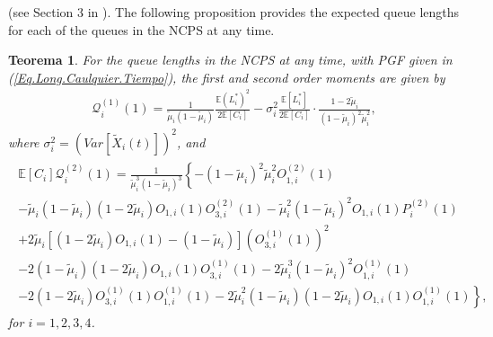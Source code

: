 \documentclass{article}
\newtheorem{Teo}{Teorema}
\newcommand{\esp}{\mathbb{E}}
\begin{document}
(see Section 3 in \cite{Takagi}). The following proposition provides the expected queue lengths for each of the queues in the NCPS at any time.
\begin{Teo}
For the queue lengths in the NCPS at any time, with PGF given in (\ref{Eq.Long.Caulquier.Tiempo}), the first and second order moments are given by
\begin{eqnarray}
\mathcal{Q}_{i}^{(1)}\left(1\right)=\frac{1}{\tilde{\mu}_{i}\left(1-\tilde{\mu}_{i}\right)}\frac{\esp (L_{i}^{*})^{2}}{2\esp\left[C_{i}\right]}
-\sigma_{i}^{2}\frac{\esp\left[L_{i}^{*}\right]}{2\esp \left[C_{i}\right]}\cdot\frac{1-2\tilde{\mu}_{i}}{\left(1-\tilde{\mu}_{i}\right)^{2}\tilde{\mu}_{i}^{2}},
\end{eqnarray}
where $\sigma_{i}^{2}=\left(Var\left[\tilde{X}_{i}\left(t\right)\right]\right)^{2}$, and 
\begin{eqnarray}
\begin{array}{l}
\esp\left[C_{i}\right]\mathcal{Q}_{i}^{(2)}\left(1\right)=\frac{1}{\tilde{\mu}_{i}^{3}\left(1-\tilde{\mu}_{i}\right)^{3}}\left\{
-\left(1-\tilde{\mu}_{i}\right)^{2}\tilde{\mu}_{i}^{2}O_{1,i}^{(2)}(1)\right.\\
-\left.\tilde{\mu}_{i}\left(1-\tilde{\mu}_{i}\right)\left(1-2\tilde{\mu}_{i}\right)O_{1,i}(1)O_{3,i}^{(2)}(1)
-\tilde{\mu}_{i}^{2}\left(1-\tilde{\mu}_{i}\right)^{2}O_{1,i}(1)P_{i}^{(2)}(1)\right.\\
+\left.2\tilde{\mu}_{i}\left[\left(1-2\tilde{\mu}_{i}\right)O_{1,i}(1)-\left(1-\tilde{\mu}_{i}\right)\right]\left(O_{3,i}^{(1)}(1)\right)^{2}
\right.\\-\left.
2\left(1-\tilde{\mu}_{i}\right)\left(1-2\tilde{\mu}_{i}\right)O_{1,i}(1)O_{3,i}^{(1)}(1)
-2\tilde{\mu}_{i}^{3}\left(1-\tilde{\mu}_{i}\right)^{2}O_{1,i}^{(1)}(1)
\right.\\-\left.
2\left(1-2\tilde{\mu}_{i}\right)O_{3,i}^{(1)}(1)O_{1,i}^{(1)}(1)
-2\tilde{\mu}_{i}^{2}\left(1-\tilde{\mu}_{i}\right)\left(1-2\tilde{\mu}_{i}\right)O_{1,i}(1)O_{1,i}^{(1)}(1)\right\},
\end{array}
\end{eqnarray}
for $i=1,2,3,4$. 
\end{Teo}
\end{document}
